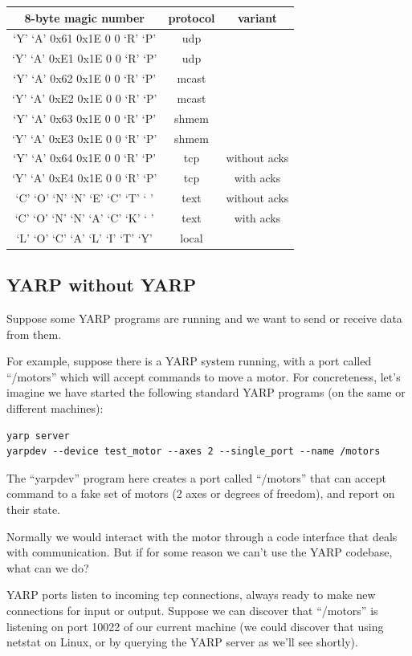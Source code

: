 \begin{tabular}{c|c|c}
\hline
8-byte magic number&protocol&variant \\\hline
`Y' `A' 0x61 0x1E 0 0 `R' `P'&udp&\\\hline
`Y' `A' 0x\-E1 0x1E 0 0 `R' `P'&udp&\\\hline
`Y' `A' 0x62 0x1E 0 0 `R' `P'&mcast&\\\hline
`Y' `A' 0x\-E2 0x1E 0 0 `R' `P'&mcast&\\\hline
`Y' `A' 0x63 0x1E 0 0 `R' `P'&shmem&\\\hline
`Y' `A' 0x\-E3 0x1E 0 0 `R' `P'&shmem&\\\hline
`Y' `A' 0x64 0x1E 0 0 `R' `P'&tcp&without acks \\\hline
`Y' `A' 0x\-E4 0x1E 0 0 `R' `P'&tcp&with acks \\\hline
`C' `O' `N' `N' `E' `C' `T' ` ' &text&without acks \\\hline
`C' `O' `N' `N' `A' `C' `K' ` ' &text&with acks \\\hline
`L' `O' `C' `A' `L' `I' `T' `Y'&local&\\\hline
\end{tabular}



\subsection{YARP without YARP}

Suppose some YARP programs are running and we want to send or
receive data from them.

For example, suppose there is a YARP system running, with a 
port called ``/motors'' which will accept commands to move a
motor.  For concreteness, let's imagine we have started the
following standard YARP programs (on the same or different 
machines):

\begin{verbatim}
yarp server
yarpdev --device test_motor --axes 2 --single_port --name /motors
\end{verbatim}

The ``yarpdev'' program here creates a port called ``/motors'' that can
accept command to a fake set of motors (2 axes or degrees of freedom),
and report on their state.

Normally we would interact with the motor through a code
interface that deals with communication.  But if for 
some reason we can't use the YARP codebase, what can
we do?

YARP ports listen to incoming tcp connections, always ready to make
new connections for input or output.  Suppose we can discover that
``/motors'' is listening on port 10022 of our current machine (we could
discover that using netstat on Linux, or by querying the YARP server
as we'll see shortly).

